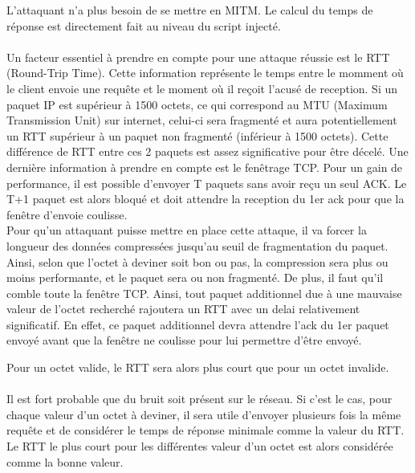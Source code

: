 L'attaquant n'a plus besoin de se mettre en MITM. Le calcul du temps de réponse est directement fait au niveau du script injecté.

\paragraph{}
Un facteur essentiel à prendre en compte pour une attaque réussie est le RTT (Round-Trip Time). Cette information représente le temps entre le momment où le client envoie une requête et le moment où il reçoit l'acusé de reception. Si un paquet IP est supérieur à 1500 octets, ce qui correspond au MTU (Maximum Transmission Unit) sur internet, celui-ci  sera fragmenté et aura potentiellement un RTT supérieur à un paquet non fragmenté (inférieur à 1500 octets). Cette différence de RTT entre ces 2 paquets est assez significative pour être décelé. Une dernière information à prendre en compte est le fenêtrage TCP. Pour un gain de performance, il est possible d'envoyer T paquets sans avoir reçu un seul ACK. Le T+1 paquet est alors bloqué et doit attendre la reception du 1er ack pour que la fenêtre d'envoie coulisse.\\

Pour qu'un attaquant puisse mettre en place cette attaque, il va forcer la longueur des données compressées jusqu'au seuil de fragmentation du paquet. Ainsi, selon que l'octet à deviner soit bon ou pas, la compression sera plus ou moins performante, et le paquet sera ou non fragmenté. De plus, il faut qu'il comble toute la fenêtre TCP. Ainsi, tout paquet additionnel due à une mauvaise valeur de l'octet recherché rajoutera un RTT avec un delai relativement significatif. En effet, ce paquet additionnel devra attendre l'ack du 1er paquet envoyé avant que la fenêtre ne coulisse pour lui permettre d'être envoyé.

Pour un octet valide, le RTT sera alors plus court que pour un octet invalide.

\paragraph{}
Il est fort probable que du bruit soit présent sur le réseau. Si c'est le cas, pour chaque valeur d'un octet à deviner, il sera utile d'envoyer plusieurs fois la même requête et de considérer le temps de réponse minimale comme la valeur du RTT. Le RTT le plus court pour les différentes valeur d'un octet est alors considérée comme la bonne valeur.\\

